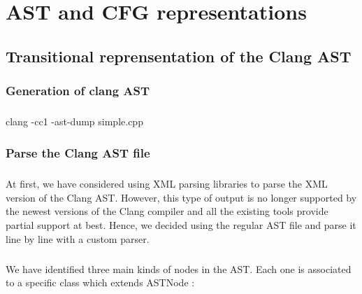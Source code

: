 \documentclass{report}
\begin{document}
\chapter{AST and CFG representations}

\paragraph{}
\hspace{4mm}\textnormal{}

\section{Transitional reprensentation of the Clang AST}

\subsection{Generation of clang AST}

\paragraph{}
\hspace{4mm}\textnormal{clang -cc1 -ast-dump simple.cpp}

\subsection{Parse the Clang AST file}

\paragraph{}
\hspace{4mm}\textnormal{At first, we have considered using XML parsing libraries to parse the XML version of the Clang AST. However, 
this type of output is no longer supported by the newest versions of the Clang compiler and all the existing tools
provide partial support at best. Hence, we decided using the regular AST file and parse it line by line 
with a custom parser.}

\paragraph{}
\hspace{4mm}\textnormal{We have identified three main kinds of nodes in the AST. Each one is associated to a specific class which extends ASTNode :}
\end{document}
